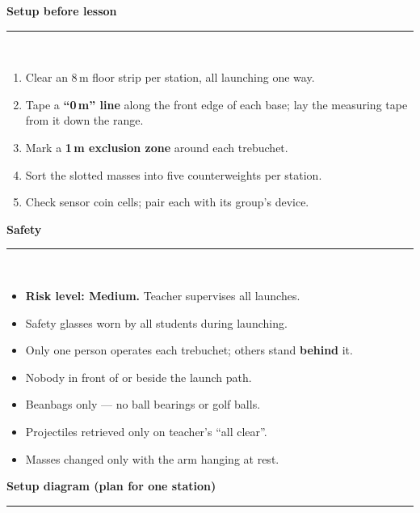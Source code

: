 \documentclass[11pt,a4paper]{article}
\newcommand{\sechead}[1]{%
  \vspace{2pt}%
  {\bfseries\large\color{HeadGrey} #1}\\[-2pt]
  {\color{RuleGrey}\rule{\linewidth}{0.8pt}}\\[2pt]
}
\begin{document}
\begin{minipage}[t]{0.50\linewidth}
\sechead{Setup before lesson}
\begin{enumerate}[itemsep=1pt, leftmargin=1.5em, topsep=2pt]
  \item Clear an 8\,m floor strip per station, all launching one way.
  \item Tape a \textbf{``0\,m'' line} along the front edge of each base; lay the measuring tape from it down the range.
  \item Mark a \textbf{1\,m exclusion zone} around each trebuchet.
  \item Sort the slotted masses into five counterweights per station.
  \item Check sensor coin cells; pair each with its group's device.
\end{enumerate}
\end{minipage}
\hfill
\begin{minipage}[t]{0.46\linewidth}
\sechead{Safety}
\begin{itemize}[itemsep=1pt, leftmargin=1.5em, topsep=2pt, label=\textbullet]
  \item \textbf{Risk level: Medium.} Teacher supervises all launches.
  \item Safety glasses worn by all students during launching.
  \item Only one person operates each trebuchet; others stand \textbf{behind} it.
  \item Nobody in front of or beside the launch path.
  \item Beanbags only --- no ball bearings or golf balls.
  \item Projectiles retrieved only on teacher's ``all clear''.
  \item Masses changed only with the arm hanging at rest.
\end{itemize}
\end{minipage}

\sechead{Setup diagram (plan for one station)}
\end{document}
